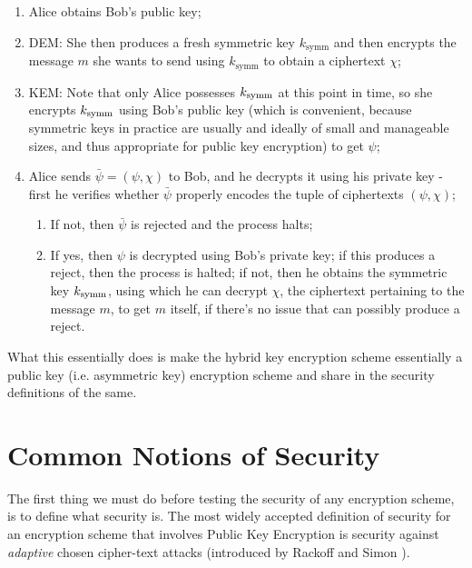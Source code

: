 \begin{enumerate}
\item Alice obtains Bob's public key;
\item \textsc{DEM}: She then produces a fresh symmetric key $k_\text{symm}$ and then encrypts the message $m$ she wants to send using $k_\text{symm}$ to obtain a ciphertext $\chi$;
\item \textsc{KEM}: Note that only Alice possesses $k_{\text{symm}}$ at this point in time, so she encrypts $k_{\text{symm}}$ using Bob's public key (which is convenient, because symmetric keys in practice are usually and ideally of small and manageable sizes, and thus appropriate for public key encryption) to get $\psi$;
\item Alice sends $\bar\psi=(\psi,\chi)$ to Bob, and he decrypts it using his private key - first he verifies whether $\bar\psi$ properly encodes the tuple of ciphertexts $(\psi,\chi)$;

\begin{enumerate}
\item If not, then $\bar\psi$ is rejected and the process halts;
\item If yes, then $\psi$ is decrypted using Bob's private key; if this produces a reject, then the process is halted; if not, then he obtains the symmetric key $k_{\text{symm}}$, using which he can decrypt $\chi$, the ciphertext pertaining to the message $m$, to get $m$ itself, if there's no issue that can possibly produce a reject.
\end{enumerate}

\end{enumerate}

What this essentially does is make the hybrid key encryption scheme essentially a public key (i.e. asymmetric key) encryption scheme and share in the security definitions of the same.\\

\section{Common Notions of Security}

\cite{shoup_cca}
The first thing we must do before testing the security of any encryption scheme, is to define what security is. The most widely accepted definition of security for an encryption scheme that involves Public Key Encryption is security against \emph{adaptive} chosen cipher-text attacks (introduced by Rackoff and Simon \cite{RS}).\\

